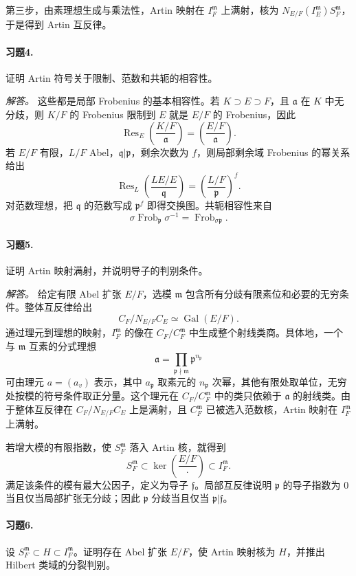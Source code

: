 \documentclass[11pt,a4paper,openany]{ctexbook}
\numberwithin{equation}{chapter}
\newcommand{\Gal}{\operatorname{Gal}}
\newcommand{\Frob}{\operatorname{Frob}}
\theoremstyle{plain}
\theoremstyle{definition}
\theoremstyle{remark}
\begin{document}
第三步，由素理想生成与乘法性，Artin 映射在 $I_F^\mathfrak m$ 上满射，核为 $N_{E/F}(I_E^\mathfrak m)S_F^\mathfrak m$，于是得到 Artin 互反律。

\paragraph{习题4.}
证明 Artin 符号关于限制、范数和共轭的相容性。

\emph{解答。}
这些都是局部 Frobenius 的基本相容性。若 $K\supset E\supset F$，且 $\mathfrak a$ 在 $K$ 中无分歧，则 $K/F$ 的 Frobenius 限制到 $E$ 就是 $E/F$ 的 Frobenius，因此
\[
\operatorname{Res}_{E}\left(\frac{K/F}{\mathfrak a}\right)
=\left(\frac{E/F}{\mathfrak a}\right).
\]
若 $E/F$ 有限，$L/F$ Abel，$\mathfrak q| \mathfrak p$，剩余次数为 $f$，则局部剩余域 Frobenius 的幂关系给出
\[
\operatorname{Res}_{L}\left(\frac{LE/E}{\mathfrak q}\right)
=\left(\frac{L/F}{\mathfrak p}\right)^f.
\]
对范数理想，把 $\mathfrak q$ 的范数写成 $\mathfrak p^f$ 即得交换图。共轭相容性来自
\[
\sigma\Frob_\mathfrak p\sigma^{-1}=\Frob_{\sigma\mathfrak p}.
\]

\paragraph{习题5.}
证明 Artin 映射满射，并说明导子的判别条件。

\emph{解答。}
给定有限 Abel 扩张 $E/F$，选模 $\mathfrak m$ 包含所有分歧有限素位和必要的无穷条件。整体互反律给出
\[
C_F/N_{E/F}C_E\simeq\Gal(E/F).
\]
通过理元到理想的映射，$I_F^\mathfrak m$ 的像在 $C_F/C_F^\mathfrak m$ 中生成整个射线类商。具体地，一个与 $\mathfrak m$ 互素的分式理想
\[
\mathfrak a=\prod_{\mathfrak p\nmid\mathfrak m}\mathfrak p^{n_\mathfrak p}
\]
可由理元 $a=(a_v)$ 表示，其中 $a_\mathfrak p$ 取素元的 $n_\mathfrak p$ 次幂，其他有限处取单位，无穷处按模的符号条件取正分量。这个理元在 $C_F/C_F^\mathfrak m$ 中的类只依赖于 $\mathfrak a$ 的射线类。由于整体互反律在 $C_F/N_{E/F}C_E$ 上是满射，且 $C_F^\mathfrak m$ 已被选入范数核，Artin 映射在 $I_F^\mathfrak m$ 上满射。

若增大模的有限指数，使 $S_F^\mathfrak m$ 落入 Artin 核，就得到
\[
S_F^\mathfrak m\subset\ker\left(\frac{E/F}{\cdot}\right)\subset I_F^\mathfrak m.
\]
满足该条件的模有最大公因子，定义为导子 $\mathfrak f$。局部互反律说明 $\mathfrak p$ 的导子指数为 $0$ 当且仅当局部扩张无分歧；因此 $\mathfrak p$ 分歧当且仅当 $\mathfrak p|\mathfrak f$。

\paragraph{习题6.}
设 $S_F^\mathfrak m\subset H\subset I_F^\mathfrak m$。证明存在 Abel 扩张 $E/F$，使 Artin 映射核为 $H$，并推出 Hilbert 类域的分裂判别。
\end{document}
